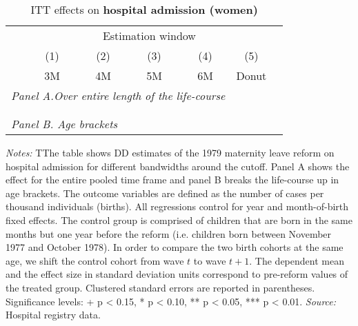 \vspace*{\fill}
 \begin{table}[H] \centering 
 	\begin{threeparttable} \centering \caption{ITT effects on \textbf{hospital admission (women)}}\label{tab: DD_hopsital2_female} {\def\sym#1{\ifmmode^{#1}\else\(^{#1}\)\fi} 
 			\begin{tabular}{l*{6}{c}}
 				\toprule 
 				& \multicolumn{5}{c}{Estimation window} \\ 
 				\cmidrule(lr){2-6}
 				&\multicolumn{1}{c}{(1)}&\multicolumn{1}{c}{(2)}&\multicolumn{1}{c}{(3)}&\multicolumn{1}{c}{(4)}&\multicolumn{1}{c}{(5)}\\
 				&\multicolumn{1}{c}{3M}&\multicolumn{1}{c}{4M}&\multicolumn{1}{c}{5M}&\multicolumn{1}{c}{6M}&\multicolumn{1}{c}{Donut}\\
 				\midrule
 				\multicolumn{5}{l}{\emph{Panel A.Over entire length of the life-course}} \\
 				 \\ \\
 				\multicolumn{5}{l}{\emph{Panel B. Age brackets}} \\
 				    
 				\bottomrule 
 		\end{tabular}}
 		\begin{tablenotes} 
 			\item \scriptsize \emph{Notes:} TThe table shows DD estimates of the 1979 maternity leave reform on hospital admission for different bandwidths around the cutoff. Panel A shows the effect for the entire pooled time frame and panel B breaks the life-course up in age brackets. The outcome variables are defined as the number of cases per thousand individuals (births). All regressions control for year and month-of-birth fixed effects. The control group is comprised of children that are born in the same months but one year before the reform (i.e. children born between November 1977 and October 1978). In order to compare the two birth cohorts at the same age, we shift the control cohort from wave $t$ to wave $t+1$. The dependent mean and the effect size in standard deviation units correspond to pre-reform values of the treated group. Clustered standard errors are reported in parentheses. \newline Significance levels: + p < 0.15, * p < 0.10, ** p < 0.05, *** p < 0.01. \newline 	\emph{Source:} Hospital registry data.
 		\end{tablenotes} 
 	\end{threeparttable} 
 \end{table}
\vspace*{\fill}\clearpage 